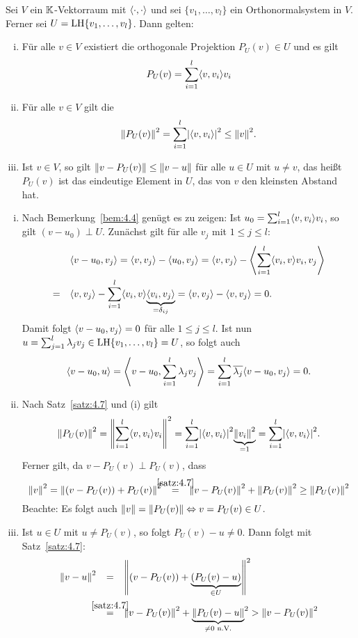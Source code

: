 \begin{satz}
	\label{satz:4.9}
	Sei $V$ ein $\mathbb{K}$-Vektorraum mit $\left\langle\cdot,\cdot\right\rangle$ und sei $\{v_1,\dots,v_l\}$ ein Orthonormalsystem in $V$.
	Ferner sei $U = \operatorname{LH}\{v_1,\dots,v_l\}$.
	Dann gelten:
	\begin{enumerate}[(i)]
		\item Für alle $v \in V$ existiert die orthogonale Projektion $P_U(v) \in U$ und es gilt
		\[
			P_U(v) = \sum_{i=1}^{l} \sk{v,v_i} v_i
		\]
		\item Für alle $v \in V$ gilt die 
		\[
			\no{P_U(v)}^2 = \sum_{i=1}^{l} \abs{\sk{v,v_i}}^2 \leq \no{v}^2.
		\]
		\item Ist $v \in V$, so gilt $\left\lVert v- P_U(v)\right\rVert \leq \left\lVert v-u\right\rVert$ für alle $u \in U$ mit $u \neq v$, das heißt $P_U(v)$ ist das eindeutige Element in $U$, das von $v$ den kleinsten Abstand hat.
	\end{enumerate}
\end{satz}

\begin{beweis}
	\begin{enumerate}[(i)]
		\item Nach Bemerkung~\ref{bem:4.4} genügt es zu zeigen:
		Ist $u_0 = \sum_{i=1}^{l} \sk{v,v_i} v_i$, so gilt $(v-u_0) \perp U$.
		Zunächst gilt für alle $v_j$ mit $1 \leq j \leq l$:
		\begin{align*}
			&\sk{v-u_0,v_j} = \sk{v,v_j} - \sk{u_0,v_j} = \sk{v,v_j} - \sk{\sum_{i=1}^{l} \sk{v_i,v}v_i,v_j} \\
			=\quad &\sk{v,v_j} - \sum_{i=1}^{l} \sk{v_i,v} \Underbrace{\sk{v_i,v_j}}{=\delta_{ij}} = \sk{v,v_j} - \sk{v,v_j} = 0.
		\end{align*}
		Damit folgt $\left\langle v-u_0,v_j\right\rangle = 0$ für alle $1 \leq j \leq l$.
		Ist nun $u = \sum_{j=1}^{l} \lambda_j v_j \in \operatorname{LH}\{v_1,\dots,v_l\} = U$, so folgt auch
		\[
			\sk{v-u_0,u} = \sk{v-u_0,\sum_{i=1}^{l} \lambda_j v_j} = \sum_{i=1}^{l} \ol{\lambda_j} \sk{v-u_0,v_j} = 0.
		\]
		\item Nach Satz~\ref{satz:4.7} und (i) gilt
		\[
			\no{P_U(v)}^2 = \no{\sum_{i=1}^{l} \sk{v,v_i} v_i}^2 = \sum_{i=1}^{l} \abs{\sk{v,v_i}}^2 \Underbrace{\no{v_i}^2}{=1} = \sum_{i=1}^{l} \abs{\sk{v,v_i}}^2.
		\]
		Ferner gilt, da $v - P_U(v) \perp P_U(v)$, dass
		\[
			\no{v}^2 = \no{(v-P_U(v)) + P_U(v)}^2 \stack{\ref{satz:4.7}}{=} \no{v - P_U(v)}^2 + \no{P_U(v)}^2 \geq \no{P_U(v)}^2
		\]
		Beachte: Es folgt auch $\left\lVert v\right\rVert = \left\lVert P_U(v)\right\rVert \Leftrightarrow v = P_U(v) \in U$.
		\item Ist $u \in U$ mit $u \neq P_U(v)$, so folgt $P_U(v) - u \neq 0$.
		Dann folgt mit Satz~\ref{satz:4.7}:
		\begin{align*}
			\no{v-u}^2 &\stack{}{=} \no{(v-P_U(v)) + \Underbrace{(P_U(v) - u)}{\in U}}^2 \\
			&\stack{\ref{satz:4.7}}{=} \no{v-P_U(v)}^2 + \Underbrace{\no{P_U(v)-u}}{\neq 0 \text{ n.V.}}^2 > \no{v-P_U(v)}^2 
		\end{align*}
	\end{enumerate}
\end{beweis}

